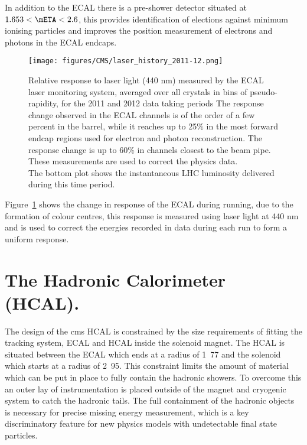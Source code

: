 In addition to the ECAL there is a pre-shower detector situated at $1.653 < 
\mETA < 2.6$, this provides identification of elections against minimum 
ionising particles and improves the position measurement of electrons and 
photons in the ECAL endcaps.
\begin{figure}[ht]
  \centering
    \texttt{[image: figures/CMS/laser\_history\_2011-12.png]}
  \caption{Relative response to laser light (440 nm) measured by the ECAL laser 
monitoring system, averaged over all crystals in bins of pseudo-rapidity, for 
the 2011 and 2012 data taking periods 
The response change observed in the ECAL channels is of the order of a few 
percent in the barrel, while it reaches up to 25$\%$ in the most forward endcap 
regions used for electron and photon reconstruction. The response change is up 
to 60$\%$ in channels closest to the beam pipe. These measurements are used to 
correct the physics data. \\ The bottom plot shows the instantaneous LHC 
luminosity delivered during this time period.\cite{CMS-DP-2012-015}}
  \label{fig:figures_CMS_laser_history_2011-12}
\end{figure}

Figure~\ref{fig:figures_CMS_laser_history_2011-12} shows the change in response 
of the ECAL during running, due to the formation of colour centres, this 
response is measured using laser light at 440 nm and is used to correct the 
energies recorded in data during each run to form a uniform response.


\section{The Hadronic Calorimeter (HCAL).} %
\label{sec:the_hadronic_calorimeter}
The design of the \ac{cms} HCAL is constrained by the size requirements of 
fitting the tracking system, ECAL and HCAL inside the solenoid magnet. The HCAL 
is situated between the ECAL which ends at a radius of \unit{1.77}{\meter} and 
the solenoid which starts at a radius of \unit{2.95}{\meter}. This constraint 
limits the amount of material which can be put in place to fully contain the 
hadronic showers. To overcome this an outer lay of instrumentation is placed 
outside of the magnet and cryogenic system to catch the hadronic tails. The 
full containment of the hadronic objects is necessary for precise missing 
energy measurement, which is a key discriminatory feature for new physics 
models with undetectable final state particles.

